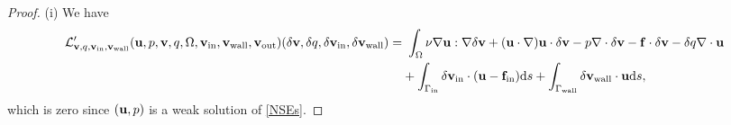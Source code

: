 \documentclass[oneside,11pt]{book}
\numberwithin{equation}{section}
\begin{document}
\begin{proof}
    (i) We have
    \begin{align}
        \mathcal{L}_{{\bf v},q,{\bf v}_{\rm in},{\bf v}_{\rm wall}}'({\bf u},p,{\bf v},q,\Omega,{\bf v}_{\rm in},{\bf v}_{\rm wall},{\bf v}_{\rm out})(\delta{\bf v},\delta q,\delta{\bf v}_{\rm in},\delta{\bf v}_{\rm wall}) =&\ \int_\Omega \nu\nabla{\bf u}:\nabla\delta{\bf v} + ({\bf u}\cdot\nabla){\bf u}\cdot\delta{\bf v} - p\nabla\cdot\delta{\bf v} - {\bf f}\cdot\delta{\bf v} - \delta q\nabla\cdot{\bf u}\\
        &+ \int_{\Gamma_{\rm in}} \delta{\bf v}_{\rm in}\cdot({\bf u} - {\bf f}_{\rm in}){\rm d}s + \int_{\Gamma_{\rm wall}} \delta{\bf v}_{\rm wall}\cdot{\bf u}{\rm d}s,
    \end{align}
    which is zero since $({\bf u},p)$ is a weak solution of \eqref{NSEs}.
    

\end{proof}
\end{document}
